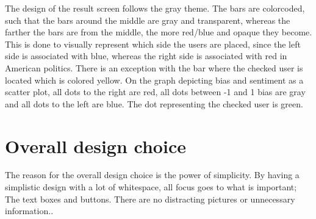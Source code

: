
The design of the result screen follows the gray theme. The bars are colorcoded,
such that the bars around the middle are gray and transparent, whereas the
farther the bars are from the middle, the more red/blue and opaque they become.
This is done to visually represent which side the users are placed, since the
left side is associated with blue, whereas the right side is associated with red
in American politics. There is an exception with the bar where the checked user
is located which is colored yellow. On the graph depicting bias and sentiment as
a scatter plot, all dots to the right are red, all dots between -1 and 1 bias are
gray and all dots to the left are blue. The dot representing the checked user is
green.

\section{Overall design choice}
The reason for the overall design choice is the power of simplicity. By having a
simplistic design with a lot of whitespace, all focus goes to what is
important; The text boxes and buttons. There are no distracting
pictures or unnecessary information.\citep[p. 26 \& 32]{WebUI}.\\